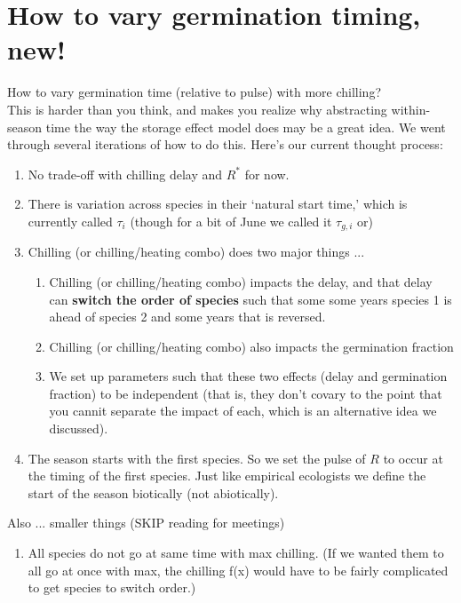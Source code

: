 \documentclass[11pt,letter]{article}
\begin{document}
\section{How to vary germination timing, new!} 

How to vary germination time (relative to pulse) with more chilling? \\

This is harder than you think, and makes you realize why abstracting within-season time the way the storage effect model does may be a great idea. We went through several iterations of how to do this. Here's our current thought process:\\

\begin{enumerate}
\item No trade-off with chilling delay and $R^*$ for now. 
\item There is variation across species in their `natural start time,' which is currently called $\tau_{i}$ (though for a bit of June we called it $\tau_{g,i}$ or)
\item Chilling (or chilling/heating combo) does two major things ... 
\begin{enumerate}
\item Chilling (or chilling/heating combo) impacts the delay, and that delay can {\bf switch the order of species} such that some some years species 1 is ahead of species 2 and some years that is reversed.
\item Chilling (or chilling/heating combo) also impacts the germination fraction
\item We set up parameters such that these two effects (delay and germination fraction) to be independent (that is, they don't covary to the point that you cannit separate the impact of each, which is an alternative idea we discussed). 
\end{enumerate}
\item The season starts with the first species. So we set the pulse of $R$ to occur at the timing of the first species. Just like empirical ecologists we define the start of the season biotically (not abiotically). 
\end{enumerate}

Also ... smaller things (SKIP reading for meetings)
\begin{enumerate}
\item All species do not go at same time with max chilling. (If we wanted them to all go at once with max, the chilling f(x) would have to be fairly complicated to get species to switch order.) 
\end{enumerate}
\end{document}
